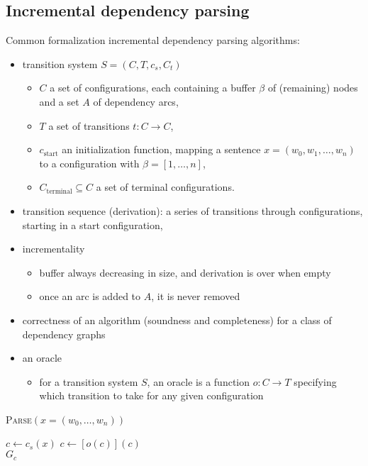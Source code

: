 \documentclass[10pt]{beamer}%
\theoremstyle{remark}
\begin{document}
\subsection{Incremental dependency parsing}
\begin{frame}

  Common formalization incremental dependency parsing algorithms:
  \begin{itemize}[<+->]
    \item \alert{transition system} $S=(C,T,c_s,C_t)$
      \begin{itemize}
        \item $C$ a set of configurations, each containing a buffer $\beta$ of (remaining) nodes and a set $A$ of dependency arcs,
        \item $T$ a set of transitions $t : C \to C$,
        \item $c_\mathrm{start}$ an initialization function, mapping a sentence $x = (w_0,w_1,\ldots,w_n)$ to a configuration with $\beta = [1, \ldots , n]$,
        \item $C_\mathrm{terminal} \subseteq C$ a set of terminal configurations.
      \end{itemize}
    \item \alert{transition sequence} (derivation): a series of transitions through configurations, starting in a start configuration,
    \item incrementality
      \begin{itemize}
        \item buffer always decreasing in size, and derivation is over when empty
        \item once an arc is added to $A$, it is never removed
      \end{itemize}
    \item correctness of an algorithm (soundness and completeness) for a class of dependency graphs
    \item an \alert{oracle}
      \begin{itemize}
        \item for a transition system $S$, an oracle is a function $o : C \to T$ specifying which transition to take for any given configuration
      \end{itemize}
  \end{itemize}

  \onslide<+->

  \begin{alertblock}{\textsc{Parse}$(x=(w_0,\ldots,w_n))$}
    \begin{algorithmic}[1]
      \State$c\gets c_s(x)$
      \State$c\gets [o(c)](c)$
      \EndWhile\\
      \Return$G_c$
    \end{algorithmic}
  \end{alertblock}


\end{frame}
\end{document}
